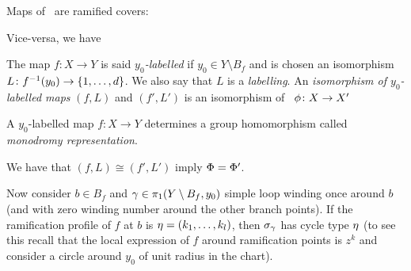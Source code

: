 \documentclass[../main/main.tex]{subfiles}
\begin{document}
Maps of \rss\ are ramified covers:


Vice-versa, we have


\begin{definition}
	The map $f\colon X\to Y$ is said \emph{$y_0$-labelled} if $y_0\in Y\setminus B_f$ and is chosen an isomorphism $L\colon f^{-1}(y_0)\to \{1,\ldots,d\}$. We also say that $L$ is a \emph{labelling}. An \emph{isomorphism of $y_0$-labelled maps} $(f,L)$ and $(f',L')$ is an isomorphism of \rss\ $\phi\colon X\to X'$ \st 
\end{definition}

\begin{definition}
	A $y_0$-labelled map $f\colon X\to Y$ determines a group homomorphism 
	called \emph{monodromy representation}.
\end{definition}

We have that $(f,L)\cong(f',L')$ imply $\Phi=\Phi'$.


Now consider $b\in B_f$ and $\gamma\in\pi_1(Y\setminus B_f,y_0)$ simple loop winding once around $b$ (and with zero winding number around the other branch points). If the ramification profile of $f$ at $b$ is $\eta=(k_1,\ldots,k_l)$, then $\sigma_\gamma$ has cycle type $\eta$ (to see this recall that the local expression of $f$ around ramification points is $z^k$ and consider a circle around $y_0$ of unit radius in the chart).
\end{document}
